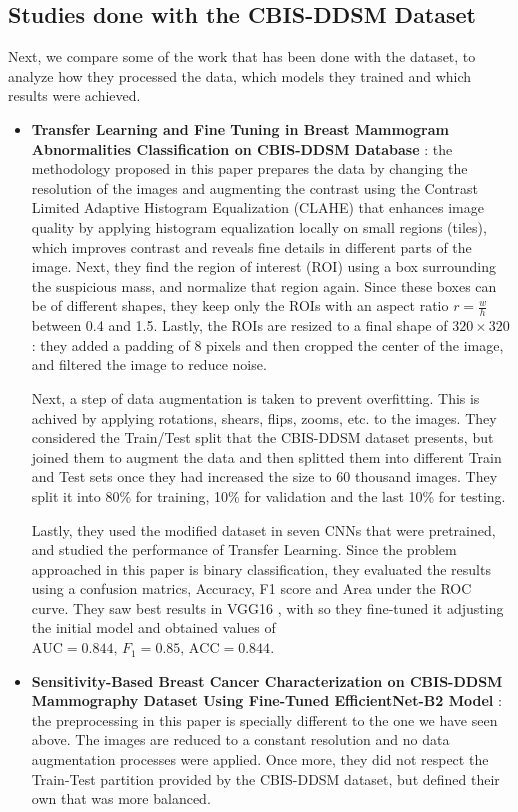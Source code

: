 \documentclass[ENG]{TFUOC}%
\begin{document}
\subsection{Studies done with the CBIS-DDSM Dataset}

Next, we compare some of the work that has been done with the dataset, to analyze how they processed the data, which models they trained and which results were achieved.

\begin{itemize}
    \item \textbf{Transfer Learning and Fine Tuning in Breast Mammogram Abnormalities Classification on CBIS-DDSM Database} \cite{binary_CBIS-DDSM_1}: 
    the methodology proposed in this paper prepares the data by changing the resolution of the images and augmenting the contrast using  the Contrast Limited Adaptive Histogram Equalization (CLAHE) \cite{clahe_original_paper} that enhances image quality by applying histogram equalization locally on small regions (tiles), which improves contrast and reveals fine details in different parts of the image. Next, they find the region of interest (ROI) using a box surrounding the suspicious mass, and normalize that region again.
    Since these boxes can be of different shapes, they keep only the ROIs with an aspect ratio $r = \frac{w}{h}$ between 0.4 and 1.5. Lastly, the ROIs are resized to a final shape of $320 \times 320$: they added a padding of 8 pixels and then cropped the center of the image, and filtered the image to reduce noise.

    Next, a step of data augmentation is taken to prevent overfitting. This is achived by applying rotations, shears, flips, zooms, etc. to the images. They considered the Train/Test split that the CBIS-DDSM dataset presents, but joined them to augment the data and then splitted them into different Train and Test sets once they had increased the size to 60 thousand images. They split it into 80\% for training, 10\% for validation and the last 10\% for testing.

    Lastly, they used the modified dataset in seven CNNs that were pretrained, and studied the performance of Transfer Learning. Since the problem approached in this paper is binary classification, they evaluated the results using a confusion matrics, Accuracy, F1 score and Area under the ROC curve. They saw best results in VGG16 \cite{vgg16}, with  so they fine-tuned it adjusting the initial model and obtained values of $\text{AUC}=0.844\text{, }F_{1}= 0.85\text{, ACC}= 0.844$.
    \item \textbf{Sensitivity-Based Breast Cancer Characterization on CBIS-DDSM Mammography Dataset Using Fine-Tuned EfficientNet-B2 Model } \cite{binary_CBIS-DDSM_2}:
    the preprocessing in this paper is specially different to the one we have seen above. The images are reduced to a constant resolution and no data augmentation processes were applied. Once more, they did not respect the Train-Test partition provided by the CBIS-DDSM dataset, but defined their own that was more balanced. 
    

\end{itemize}
\end{document}
